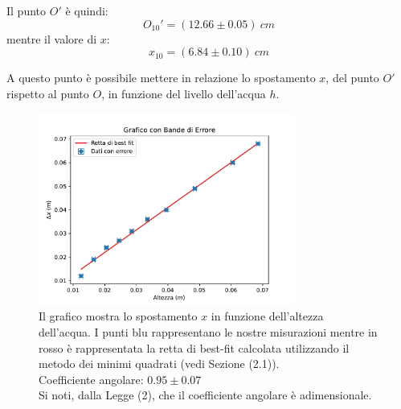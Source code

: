 Il punto $O'$ è quindi:
\begin{equation}
	O_{10}'=(12.66\pm0.05)\ cm
\end{equation}
mentre il valore di $x$:
\begin{equation}
	x_{10}=(6.84\pm 0.10)\ cm
\end{equation}
 
A questo punto è possibile mettere in relazione lo spostamento $x$, del punto $O'$ rispetto al punto $O$, in funzione del livello dell'acqua $h$. 
 
\begin{figure}[H]
	\centering
	\includegraphics[width=0.75\textwidth]{./figures/grafico1}
	\caption{Il grafico mostra lo spostamento $x$ in funzione dell'altezza dell'acqua. I punti blu rappresentano le nostre misurazioni mentre in rosso è rappresentata la retta di best-fit calcolata utilizzando il metodo dei minimi quadrati (vedi Sezione (2.1)).\\
	Coefficiente angolare: $0.95\pm 0.07$\\
	Si noti, dalla Legge (2), che il coefficiente angolare è adimensionale.}
\end{figure} 
